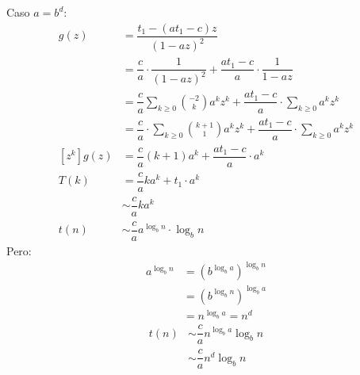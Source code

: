 \documentclass[english, spanish, fleqn, 10pt]{article}
\numberwithin{equation}{section}
\newcommand{\nparentesis}[1]{\left( #1 \right)}
\newcommand{\ncorchetes}[1]{\left[ #1 \right]}
\theoremstyle{definition}
\begin{document}
	Caso $a=b^d$:
	\begin{align*}
	g\nparentesis{z} &= \dfrac{t_1 - \nparentesis{at_1-c}z}{\nparentesis{1-az}^2}\\
	&= \dfrac{c}{a} \cdot \dfrac{1}{\nparentesis{1-az}^2} + \dfrac{at_1 - c}{a}\cdot \dfrac{1}{1-az}\\
	&=\dfrac{c}{a} \sum_{k \geq 0}\binom{-2}{k}
	a^kz^k + \dfrac{at_1 -c}{a}\cdot \sum_{k \geq 0}a ^k z^k\\
	&=\dfrac{c}{a} \cdot \sum_{k \geq 0}\binom{k + 1}{1}
	a^k z^k+ \dfrac{at_1-c}{a}\cdot \sum_{k \geq 0}a^kz^k\\
	\ncorchetes{z^k} g\nparentesis{z} &= \dfrac{c}{a} \nparentesis{k+1} a^k + \dfrac{at_1-c}{a}\cdot a^k\\
	T\nparentesis{k} &= \dfrac{c}{a} k a^k + t_1 \cdot a^k\\
	& \sim \dfrac{c}{a} k a^k\\
	t\nparentesis{n} &\sim \dfrac{c}{a} a^{\log_b n} \cdot \log_b n
	\end{align*}
	Pero: 
	\begin{align*}
	a^{\log_b n} &= \nparentesis{b^{\log_b a}}^{\log_b n}\\
	&= \nparentesis{b^{\log_b n}}^{\log_b a}\\
	&= n^{\log_b a}= n^d
	\end{align*}
	\begin{align*}
	t\nparentesis{n}&\sim \dfrac{c}{a} n^{\log_b a}\log_b n\\
	&\sim \dfrac{c}{a}n^d \log_b n
	\end{align*}
	
\end{document}
